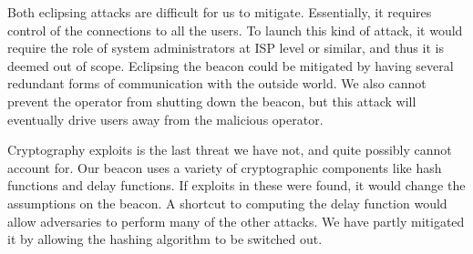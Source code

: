 Both eclipsing attacks are difficult for us to mitigate.
Essentially, it requires control of the connections to all the users.
To launch this kind of attack, it would require the role of system administrators at ISP level or similar, and thus it is deemed out of scope.
Eclipsing the beacon could be mitigated by having several redundant forms of communication with the outside world.
We also cannot prevent the operator from shutting down the beacon, but this attack will eventually drive users away from the malicious operator.

Cryptography exploits is the last threat we have not, and quite possibly cannot account for.
Our beacon uses a variety of cryptographic components like hash functions and delay functions.
If exploits in these were found, it would change the assumptions on the beacon.
A shortcut to computing the delay function would allow adversaries to perform many of the other attacks.
We have partly mitigated it by allowing the hashing algorithm to be switched out.
